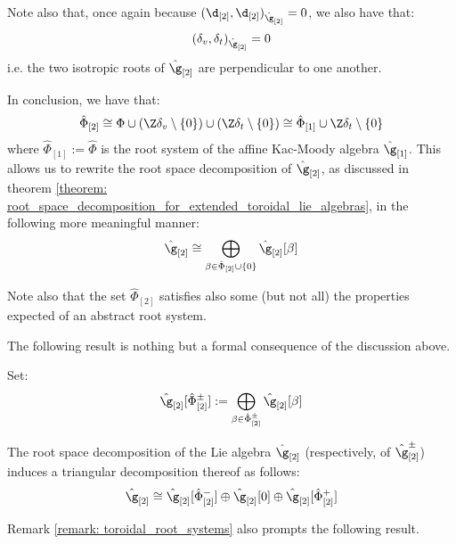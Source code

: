 \begin{remark}
\begin{enumerate}
                Note also that, once again because $(\d_{[2]}, \d_{[2]})_{\hat{\g}_{[2]}} = 0$, we also have that:
                    $$(\delta_v, \delta_t)_{\hat{\g}_{[2]}} = 0$$
                i.e. the two isotropic roots of $\hat{\g}_{[2]}$ are perpendicular to one another. 
            \end{enumerate}

            In conclusion, we have that:
                $$\hat{\Phi}_{[2]} \cong \Phi \cup (\Z \delta_v \setminus \{0\}) \cup (\Z \delta_t \setminus \{0\}) \cong \hat{\Phi}_{[1]} \cup \Z \delta_t \setminus \{0\}$$
            where $\hat{\Phi}_{[1]} := \hat{\Phi}$ is the root system of the affine Kac-Moody algebra $\hat{\g}_{[1]}$. This allows us to rewrite the root space decomposition of $\hat{\g}_{[2]}$, as discussed in theorem \ref{theorem: root_space_decomposition_for_extended_toroidal_lie_algebras}, in the following more meaningful manner:
                $$\hat{\g}_{[2]} \cong \bigoplus_{\beta \in \hat{\Phi}_{[2]} \cup \{0\}} \hat{\g}_{[2]}[\beta]$$

            Note also that the set $\hat{\Phi}_{[2]}$ satisfies also some (but not all) the properties expected of an abstract root system. 

        \end{remark}
        The following result is nothing but a formal consequence of the discussion above.
        \begin{proposition} \label{prop: triangular_decomposition_of_extended_toroidal_lie_algebras}
            Set:
                $$\hat{\g}_{[2]}[\hat{\Phi}_{[2]}^{\pm}] := \bigoplus_{\beta \in \hat{\Phi}_{[2]}^{\pm}} \hat{\g}_{[2]}[\beta]$$
        
            The root space decomposition of the Lie algebra $\hat{\g}_{[2]}$ (respectively, of $\hat{\g}_{[2]}^{\pm}$) induces a triangular decomposition thereof as follows:
                $$\hat{\g}_{[2]} \cong \hat{\g}_{[2]}[\hat{\Phi}_{[2]}^-] \oplus \hat{\g}_{[2]}[0] \oplus \hat{\g}_{[2]}[\hat{\Phi}_{[2]}^+]$$
        \end{proposition}
        Remark \ref{remark: toroidal_root_systems} also prompts the following result.
